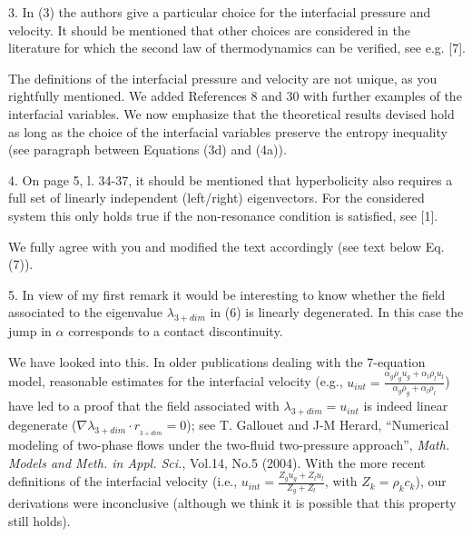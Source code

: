 \documentclass{article}
\newcommand{\tcr}[1]{\textcolor{red}{#1}}
\newcommand{\tcb}[1]{\textcolor{blue}{#1}}
\newcommand{\tcg}[1]{\textcolor{green}{#1}}
\begin{document}
{\color{blue}
3. In (3) the authors give a particular choice for the interfacial pressure and velocity.
It should be mentioned that other choices are considered in the literature for which
the second law of thermodynamics can be verified, see e.g. [7].}

The definitions of the interfacial pressure and velocity are not unique, as you rightfully mentioned. 
We added References 8 and 30 with further examples of the interfacial variables. We now emphasize 
that the theoretical results devised hold as long as the choice of the interfacial
variables preserve the entropy inequality (see paragraph between Equations (3d) and (4a)). 
%
\bigskip


{\color{blue}
4. On page 5, l. 34-37, it should be mentioned that hyperbolicity also requires a full
set of linearly independent (left/right) eigenvectors. For the considered system this
only holds true if the non-resonance condition is satisfied, see [1].
}

We fully agree with you and modified the text accordingly (see text below Eq. (7)).

\bigskip


{\color{blue}
5. In view of my first remark it would be interesting to know whether the field associated
to the eigenvalue $\lambda_{3+dim}$ in (6) is linearly degenerated. In this case the jump in $\alpha$
corresponds to a contact discontinuity.
}

We have looked into this. In older publications dealing with the 7-equation model, reasonable estimates for the interfacial velocity (e.g., $u_{int} = \frac{\alpha_g \rho_g u_g + \alpha_l \rho_l u_l}{\alpha_g \rho_g + \alpha_l \rho_l}$) have led to a proof that the field associated with $\lambda_{3+dim}=u_{int}$ is indeed linear degenerate ($\nabla \lambda_{3+dim} \cdot r__{3+dim} = 0$); 
see T. Gallouet and J-M Herard, ``Numerical modeling of two-phase flows under the two-fluid two-pressure approach'', {\it Math. Models and Meth. in Appl. Sci.}, Vol.14, No.5 (2004). 
With the more recent definitions of the interfacial velocity (i.e., $u_{int} = \frac{Z_g u_g + Z_l u_l}{Z_g + Z_l}$, with $Z_k = \rho_k c_k$), our derivations were inconclusive 
(although we think it is possible that this property still holds). 
%
\bigskip
\end{document}
